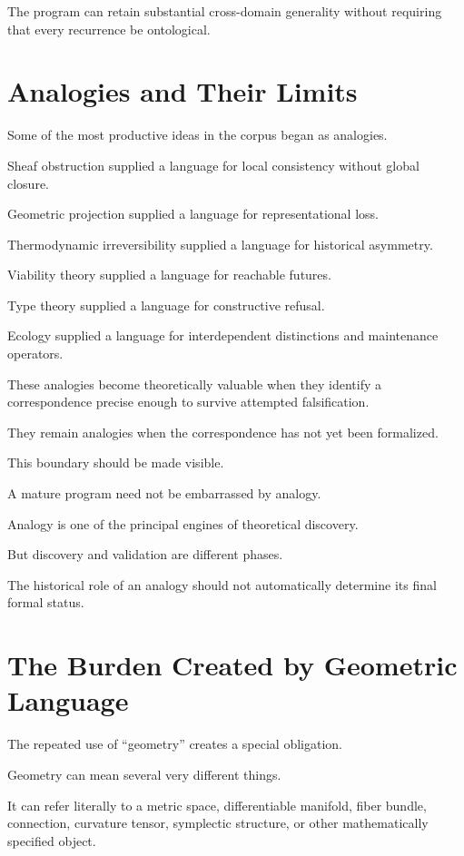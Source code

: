 \documentclass[11pt]{article}
\theoremstyle{remark}
\begin{document}
The program can retain substantial cross-domain generality without requiring
that every recurrence be ontological.

\section{Analogies and Their Limits}

Some of the most productive ideas in the corpus began as analogies.

Sheaf obstruction supplied a language for local consistency without global
closure.

Geometric projection supplied a language for representational loss.

Thermodynamic irreversibility supplied a language for historical asymmetry.

Viability theory supplied a language for reachable futures.

Type theory supplied a language for constructive refusal.

Ecology supplied a language for interdependent distinctions and maintenance
operators.

These analogies become theoretically valuable when they identify a
correspondence precise enough to survive attempted falsification.

They remain analogies when the correspondence has not yet been formalized.

This boundary should be made visible.

A mature program need not be embarrassed by analogy.

Analogy is one of the principal engines of theoretical discovery.

But discovery and validation are different phases.

The historical role of an analogy should not automatically determine its final
formal status.

\section{The Burden Created by Geometric Language}

The repeated use of ``geometry'' creates a special obligation.

Geometry can mean several very different things.

It can refer literally to a metric space, differentiable manifold, fiber bundle,
connection, curvature tensor, symplectic structure, or other mathematically
specified object.
\end{document}
